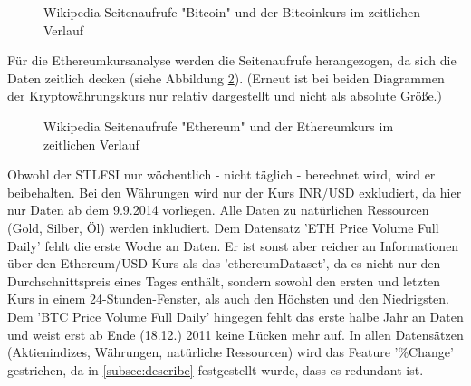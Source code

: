 \begin{figure}[H]
\centering
{}
\caption{Wikipedia Seitenaufrufe "Bitcoin" und der Bitcoinkurs im zeitlichen Verlauf}
\label{fig:WikiBTC}
\end{figure}
Für die Ethereumkursanalyse werden die Seitenaufrufe herangezogen, da sich die Daten zeitlich decken (siehe Abbildung \ref{fig:WikiETH}). (Erneut ist bei beiden Diagrammen der Kryptowährungskurs nur relativ dargestellt und nicht als absolute Größe.)
\begin{figure}[H]
\centering
{}
\caption{Wikipedia Seitenaufrufe "Ethereum" und der Ethereumkurs im zeitlichen Verlauf}
\label{fig:WikiETH}
\end{figure}
Obwohl der STLFSI nur wöchentlich - nicht täglich - berechnet wird, wird er beibehalten. Bei den Währungen wird nur der Kurs INR/USD exkludiert, da hier nur Daten ab dem 9.9.2014 vorliegen. Alle Daten zu natürlichen Ressourcen (Gold, Silber, Öl) werden inkludiert.
Dem Datensatz 'ETH \textunderscore Price \textunderscore Volume \textunderscore Full \textunderscore Daily' fehlt die erste Woche an Daten. Er ist sonst aber reicher an Informationen über den Ethereum/USD-Kurs als das 'ethereumDataset', da es nicht nur den Durchschnittspreis eines Tages enthält, sondern sowohl den ersten und letzten Kurs in einem 24-Stunden-Fenster, als auch den Höchsten und den Niedrigsten. Dem 'BTC \textunderscore Price \textunderscore Volume \textunderscore Full \textunderscore Daily' hingegen fehlt das erste halbe Jahr an Daten und weist erst ab Ende (18.12.) 2011 keine Lücken mehr auf. In allen Datensätzen (Aktienindizes, Währungen, natürliche Ressourcen) wird das Feature '\%Change' gestrichen, da in \ref{subsec:describe} festgestellt wurde, dass es redundant ist.
